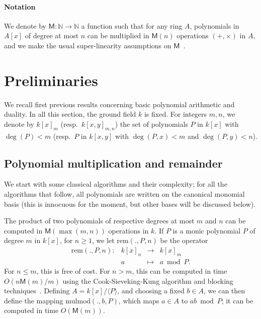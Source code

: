\documentclass{sig-alternate}
\def\M {\ensuremath{\mathsf{M}}}
\def\N {\ensuremath{\mathbb{N}}}
\def\rem {\ensuremath{\mathrm{rem}}}
\def\mulmod {\ensuremath{\mathrm{mulmod}}}
\newcounter{algo}
\newcommand{\ang}[1]{\langle#1\rangle}
\begin{document}
\paragraph*{{\bf \rm Notation}}
We denote by $\M:\N \to \N$ a function such that for any ring $A$,
polynomials in $A[x]$ of degree at most $n$ can be multiplied in
$\M(n)$ operations $(+,\times)$ in $A$, and we make the usual
super-linearity assumptions on $\M$~\cite[Chapter~8]{vzGG}. 



\section{Preliminaries}

We recall first previous results concerning basic polynomial
arithmetic and duality.  In all this section, the ground field $k$ is
fixed. For integers $m,n$, we denote by $k[x]_m$
(resp.\ $k[x,y]_{m,n}$) the set of polynomials $P$ in $k[x]$ with
$\deg(P) <m$ (resp.\ $P$ in $k[x,y]$ with $\deg(P,x) <m$ and
$\deg(P,y)<n$).


\subsection{Polynomial multiplication and remainder}

We start with some classical algorithms and their complexity; for all
the algorithms that follow, all polynomials are written on the
canonical monomial basis (this is innocuous for the moment, but other
bases will be discussed below).

The product of two polynomials of respective degrees at most $m$ and
$n$ can be computed in $\M(\max(m,n))$ operations in $k$.  If $P$ is a
monic polynomial $P$ of degree $m$ in $k[x]$, for $n \ge 1$, we let
$\rem(.,P,n)$ be the operator
$$
\begin{array}{cccc}
\rem(.,P,n): &k[x]_n& \to &k[x]_{m}\\
& a & \mapsto & a \bmod P.
\end{array}$$ 
For $n \le m$, this is free of cost. For $n > m$, this can be computed
in time $O(n\M(m)/m)$ using the Cook-Sieveking-Kung algorithm and
blocking techniques~\cite[Ch.~5.1.3]{Bostan10}. Defining
$A=k[x]/\ang{P}$, and choosing a fixed $b \in A$, we can then define
the mapping $\mulmod(.,b,P)$, which maps $a \in A$ to $ab \bmod P$; it
can be computed in time $O(\M(m))$. 
\end{document}
